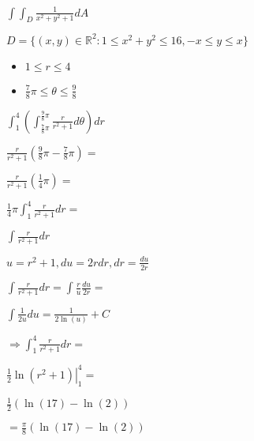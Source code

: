 \documentclass[../parcial.tex]{subfiles}
\begin{document}
    $\int \int_D \frac{1}{x^2+y^2+1} dA$

    $D= \{(x,y) \in \mathbb{R}^2: 1 \leq x^2 + y^2 \leq 16, -x \leq y \leq x\}$

    \begin{itemize}
        \item $ 1 \leq r \leq 4$
        \item $ \frac{7}{8}\pi \leq \theta \leq \frac{9}{8}$
    \end{itemize}

    $ \int_1^4 (\int_{\frac{7}{8}\pi}^{\frac{9}{8}\pi } \frac{r}{r^2+1} d\theta) dr $

    $ \frac{r}{r^2+1}(\frac{9}{8}\pi - \frac{7}{8}\pi) = $

    $ \frac{r}{r^2+1}(\frac{1}{4}\pi) = $

    $ \frac{1}{4}\pi \int_1^4 \frac{r}{r^2+1} dr = $

    $ \int \frac{r}{r^2+1} dr$

    $ u = r^2+1, du = 2r dr, dr = \frac{du}{2r}$

    $ \int \frac{r}{r^2+1} dr = \int \frac{r}{u} \frac{du}{2r} = $

    $ \int \frac{1}{2u} du = \frac{1}{2\ln(u)} + C$

    $\Rightarrow \int_1^4 \frac{r}{r^2+1} dr = $

    $ \left. \frac{1}{2} \ln(r^2+1) \right |_1^4 = $

    $\frac{1}{2}( \ln(17) - \ln(2)) $

    $ = \frac{\pi}{8}(\ln(17) - \ln(2))$
\end{document}
